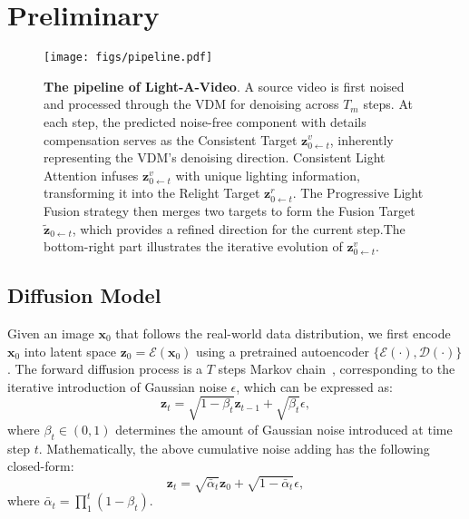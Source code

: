 \vspace{-0.5em}
\section{Preliminary}
\label{sec:preliminary}

\begin{figure*}
\centering
\texttt{[image: figs/pipeline.pdf]}
\vspace{-1.0em}
\caption{{\bf The pipeline of Light-A-Video}. A source video is first noised and processed through the VDM for denoising across $T_m$
steps. At each step, the predicted noise-free component with details compensation serves as the Consistent Target $\mathbf{z}^{v}_{0 \gets t}$, 
inherently representing the VDM's denoising direction. 
Consistent Light Attention infuses $\mathbf{z}^{v}_{0 \gets t}$ with unique lighting information,
transforming it into the Relight Target $\mathbf{z}^{r}_{0 \gets t}$.
The Progressive Light Fusion strategy then merges two targets to form the Fusion Target $\tilde{\mathbf{z}}_{0 \gets t}$, 
which provides a refined direction for the current step.The bottom-right part illustrates the iterative evolution of $\mathbf{z}^{v}_{0 \gets t}$.}
\label{fig:pipe}
\vspace{-1.2em}
\end{figure*}



\subsection{Diffusion Model}
\label{sec:dm}
Given an image $\mathbf{x}_0$ that follows the real-world data distribution, we first 
encode $\mathbf{x}_0$ into latent space $\mathbf{z}_0 = \mathcal{E}(\mathbf{x}_0)$
using a pretrained autoencoder $\{ {\mathcal{E}(\cdot)},{\mathcal{D}(\cdot)} \}$.
The forward diffusion process is a $T$ steps Markov chain~\cite{ho2020denoising},
corresponding to the iterative introduction of Gaussian noise $\epsilon$, which can be expressed as:
\begin{equation}
    \mathbf{z}_t =  \sqrt{1-\beta _t}\mathbf{z}_{t-1} + \sqrt{\beta _t} \epsilon, 
\end{equation}
where $\beta _t \in (0,1)$ determines the amount of Gaussian noise introduced at time step $t$. Mathematically, the above cumulative noise adding has the following closed-form:
\begin{equation}
    \mathbf{z}_t = \sqrt{\bar{\alpha}_t}  \mathbf{z}_{0} + \sqrt{1-\bar{\alpha}_t}\epsilon, 
\end{equation}
where $\bar{\alpha}_t =  {\textstyle \prod_{1}^{t}} (1-\beta _t)$. 

